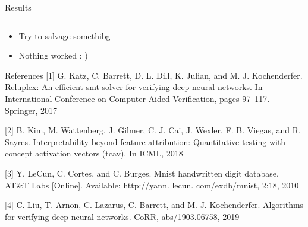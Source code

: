 \documentclass[final]{beamer}
\begin{document}
\begin{frame}[fragile]{}
\begin{textblock}{\colwidth}
\begin{paddedBlock}{Results}
\begin{table}
\begin{tabular}{lcccc}
\end{tabular}
\end{table}



\begin{itemize}
  \item Try to salvage somethibg
  \item Nothing worked : )
\end{itemize}

\end{paddedBlock}


\begin{paddedBlock}{References}
\footnotesize{[1] G. Katz, C. Barrett, D. L. Dill, K. Julian, and M. J. Kochenderfer. Reluplex: An efficient smt solver for verifying deep neural networks. In International Conference on Computer Aided Verification, pages 97–117. Springer, 2017}

\footnotesize{[2] B. Kim, M. Wattenberg, J. Gilmer, C. J. Cai, J. Wexler, F. B. Viegas, and R. Sayres. Interpretability beyond feature attribution: Quantitative testing with concept activation vectors (tcav). In ICML, 2018}

\footnotesize{[3] Y. LeCun, C. Cortes, and C. Burges. Mnist handwritten digit database. AT&T Labs [Online]. Available: http://yann. lecun. com/exdb/mnist, 2:18, 2010}

\footnotesize{[4] C. Liu, T. Arnon, C. Lazarus, C. Barrett, and M. J. Kochenderfer. Algorithms for verifying deep neural networks. CoRR, abs/1903.06758, 2019}

\end{paddedBlock}
\end{textblock}






\end{frame}
\end{document}
